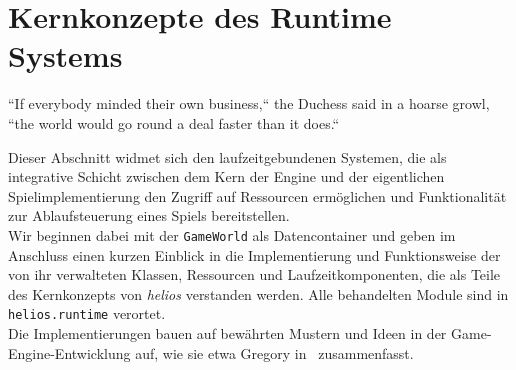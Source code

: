 \section{Kernkonzepte des Runtime Systems}

\vspace{5mm}
\begin{displayquote}
    ``If everybody minded their own business,`` the Duchess said in a hoarse growl, ``the world would go round a deal faster than it does.``
    \par\hfill\cite{Car65}
\end{displayquote}
\vspace{25mm}

Dieser Abschnitt widmet sich den laufzeitgebundenen Systemen, die als integrative Schicht zwischen dem Kern der Engine und der eigentlichen Spielimplementierung den Zugriff auf Ressourcen ermöglichen und Funktionalität zur Ablaufsteuerung eines Spiels bereitstellen.\\

Wir beginnen dabei mit der \texttt{GameWorld} als Datencontainer und geben im Anschluss einen kurzen Einblick in die Implementierung und Funktionsweise der von ihr verwalteten Klassen, Ressourcen und Laufzeitkomponenten, die als Teile des Kernkonzepts von \textit{helios} verstanden werden.
Alle behandelten Module sind in \texttt{helios.runtime} verortet.\\

Die Implementierungen bauen auf bewährten Mustern und Ideen in der Game-Engine-Entwicklung auf, wie sie etwa Gregory in~\cite[1039-1061]{Gre19} zusammenfasst.

















